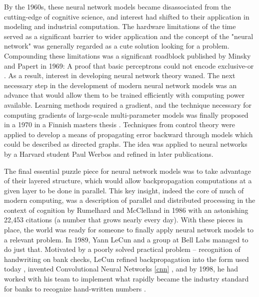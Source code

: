 By the 1960s, these neural network models became disassociated from
the cutting-edge of cognitive science, and interest had shifted to
their application in modeling and industrial computation. The hardware
limitations of the time served as a significant barrier to wider
application and the concept of the "neural network" was generally
regarded as a cute solution looking for a problem. Compounding these
limitations was a significant roadblock published by Minsky and Papert
in 1969: A proof that basic perceptrons could not encode exclusive-or
\cite{minsky1969perceptrons}. As a result, interest in developing
neural network theory waned. The next necessary step in the
development of modern neural network models was an advance that would
allow them to be trained efficiently with computing power
available. Learning methods required a gradient, and the technique
necessary for computing gradients of large-scale multi-parameter
models was finally proposed in a 1970 in a Finnish masters thesis \cite{linnainmaa1970representation}. Techniques from control theory were applied to develop a means of propagating error backward through models which could be described as directed graphs. The idea was applied to neural networks by a Harvard student Paul Werbos\cite{werbos1974beyond} and refined in later publications. 

The final essential puzzle piece for neural network models was to take
advantage of their layered structure, which would allow
backpropagation computations at a given layer to be done in
parallel. This key insight, indeed the core of much of modern
computing, was a description of parallel and distributed processing in
the context of cognition by Rumelhard and McClelland in 1986
\cite{mcclelland1986parallel} with an astonishing 22,453 citations (a
number that grows nearly every day). With these pieces in place, the
world was ready for someone to finally apply neural network models to
a relevant problem. In 1989, Yann LeCun and a group at Bell Labs
managed to do just that. Motivated by a poorly solved practical
problem -- recognition of handwriting on bank checks, LeCun refined
backpropagation into the form used today
\cite{lecun1989backpropagation}, invented Convolutional Neural
Networks \ref{cnn} \cite{lecun1995convolutional}, and by 1998, he had
worked with his team to implement what rapidly became the industry
standard for banks to recognize hand-written numbers
\cite{lecun1998gradient}.


